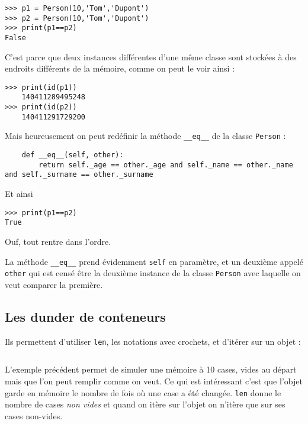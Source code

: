 \documentclass[a4paper,10pt,cours,firamath]{nsi}
\begin{document}
\begin{pyc}
	\begin{verbatim}
>>> p1 = Person(10,'Tom','Dupont')
>>> p2 = Person(10,'Tom','Dupont')
>>> print(p1==p2)
False
\end{verbatim}
\end{pyc}
C'est parce que deux instances différentes d'une même classe sont stockées à des endroits différents de la mémoire, comme on peut le voir ainsi :
\begin{pyc}
	\begin{verbatim}
>>> print(id(p1))
    140411289495248
>>> print(id(p2))
    140411291729200
\end{verbatim}
\end{pyc}
Mais heureusement on peut redéfinir la méthode \texttt{__eq__} de la classe \texttt{Person} :
\begin{pyc}
	\begin{verbatim}
	def __eq__(self, other):
		return self._age == other._age and self._name == other._name and self._surname == other._surname
\end{verbatim}
\end{pyc}
Et ainsi
\begin{pyc}
	\begin{verbatim}
>>> print(p1==p2)
True
\end{verbatim}
\end{pyc}
Ouf, tout rentre dans l'ordre.
\begin{remarque}[]
	La méthode \texttt{__eq__} prend évidemment \texttt{self} en paramètre, et un deuxième appelé \texttt{other} qui est censé être la deuxième instance de la classe \texttt{Person} avec laquelle on veut comparer la première.
\end{remarque}
\subsection*{Les dunder de conteneurs}
Ils permettent d'utiliser \texttt{len}, les notations avec crochets, et d'itérer sur un objet :

\inputminted{python}{scripts/examplegetitem.py}

L'exemple précédent permet de simuler une mémoire à 10 cases, vides au départ mais que l'on peut remplir comme on veut. Ce qui est intéressant c'est que l'objet garde en mémoire le nombre de fois où une case a été changée. \texttt{len} donne le nombre de cases \textit{non vides} et quand on itère sur l'objet on n'itère que sur ses cases non-vides.
\end{document}
